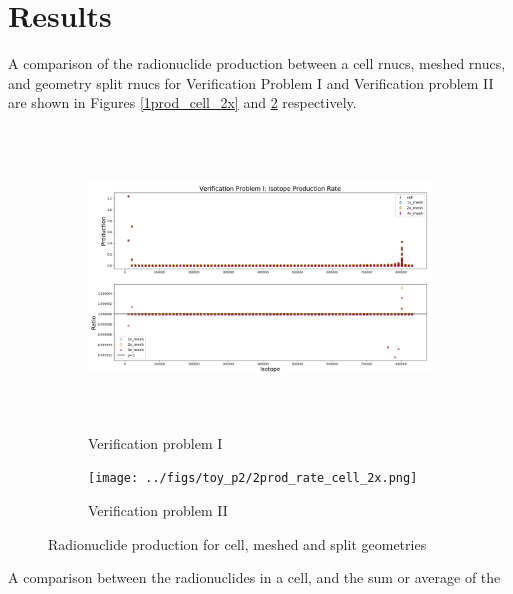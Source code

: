 \section{Results}
A comparison of the radionuclide production between a cell rnucs,
meshed rnucs, and geometry split rnucs  for Verification Problem
I and Verification problem II are shown in Figures
\ref{1prod_cell_2x} and \ref{2prod_cell_2x} respectively.\\
\begin{figure}[h]
 \begin{centering}
 \centering
 \begin{subfigure}[b]{.8\textwidth}
 \includegraphics[width=0.99\linewidth,height=8cm]{../figs/toy_p1/prod_VPI_1x_2x_4x.png}
 \caption{Verification problem I }
 \label{1prod_cell_2x_4x}
 \end{subfigure}
 \hspace{0.05cm}
 \begin{subfigure}[b]{.5\textwidth}
 \centering
 \texttt{[image: ../figs/toy\_p2/2prod\_rate\_cell\_2x.png]}
 \caption{Verification problem II}
 \label{2prod_cell_2x}
 \end{subfigure}
 \caption{Radionuclide production for cell, meshed and split geometries}
 \label{prod_cell_2x}
 \end{centering}
\end{figure}
A comparison between the radionuclides in a cell, and the sum or average of the 
